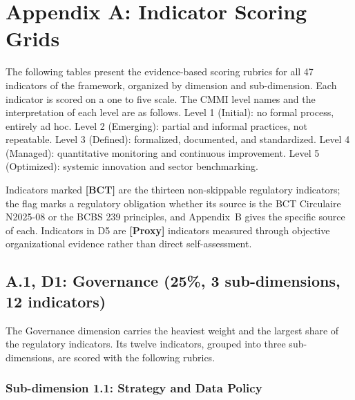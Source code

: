 
\setlength{\arrayrulewidth}{0.5pt}
\renewcommand{\arraystretch}{1.3}
\setlength{\tabcolsep}{4pt}
\section*{Appendix A: Indicator Scoring Grids}

The following tables present the evidence-based scoring rubrics for all 47 indicators of the framework, organized by dimension and sub-dimension. Each indicator is scored on a one to five scale. The CMMI level names and the interpretation of each level are as follows. Level 1 (Initial): no formal process, entirely ad hoc. Level 2 (Emerging): partial and informal practices, not repeatable. Level 3 (Defined): formalized, documented, and standardized. Level 4 (Managed): quantitative monitoring and continuous improvement. Level 5 (Optimized): systemic innovation and sector benchmarking.

\vspace{0.5em}
\noindent Indicators marked \textbf{[BCT]} are the thirteen non-skippable regulatory indicators; the flag marks a regulatory obligation whether its source is the BCT Circulaire N\textdegree{}2025-08 or the BCBS 239 principles, and Appendix~B gives the specific source of each. Indicators in D5 are \textbf{[Proxy]} indicators measured through objective organizational evidence rather than direct self-assessment.


\subsection*{A.1, D1: Governance (25\%, 3 sub-dimensions, 12 indicators)}

The Governance dimension carries the heaviest weight and the largest share of the regulatory indicators. Its twelve indicators, grouped into three sub-dimensions, are scored with the following rubrics.

\subsubsection*{Sub-dimension 1.1: Strategy and Data Policy}

